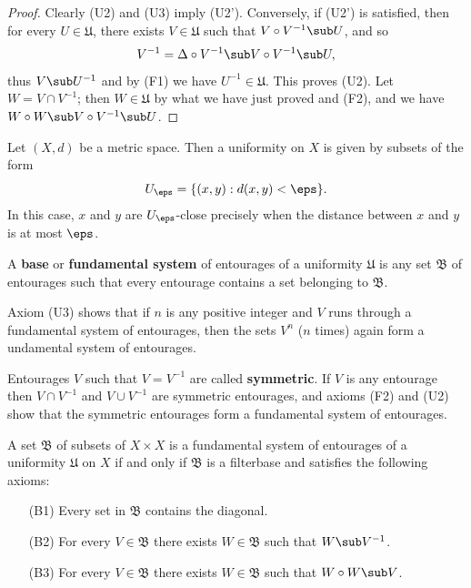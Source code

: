 \begin{proof}
Clearly (U2) and (U3) imply (U2'). Conversely, if (U2') is satisfied, then for every $U\in\mathfrak{U}$, there exists $V\in\mathfrak{U}$ such that $V\circ V^{-1}\sub U$, and so
\[V^{-1}=\Delta\circ V^{-1}\sub V\circ V^{-1}\sub U,\]
thus $V\sub U^{-1}$ and by (F1) we have $U^{-1}\in\mathfrak{U}$. This proves (U2). Let $W=V\cap V^{-1}$; then $W\in\mathfrak{U}$ by what we have just proved and (F2), and we have $W\circ W\sub V\circ V^{-1}\sub U$.
\end{proof}
\begin{example}
Let $(X,d)$ be a metric space. Then a uniformity on $X$ is given by subsets of the form
\[U_\eps=\{(x,y):d(x,y)<\eps\}.\]
In this case, $x$ and $y$ are $U_\eps$-close precisely when the distance between $x$ and $y$ is at most $\eps$.
\end{example}
A \textbf{base} or \textbf{fundamental system} of entourages of a uniformity $\mathfrak{U}$ is any set $\mathfrak{B}$ of entourages such that every entourage contains a set belonging to $\mathfrak{B}$.
\begin{example}
Axiom (U3) shows that if $n$ is any positive integer and $V$ runs through  a fundamental system of entourages, then the sets $V^n$ ($n$ times) again form a undamental system of entourages.
\end{example}
Entourages $V$ such that $V=V^{-1}$ are called \textbf{symmetric}. If $V$ is any entourage then $V\cap V^{-1}$ and $V\cup V^{-1}$ are symmetric entourages, and axioms (F2) and (U2) show that the symmetric entourages form a fundamental system of entourages.
\begin{proposition}\label{uniformity base iff}
A set $\mathfrak{B}$ of subsets of $X\times X$ is a fundamental system of entourages of a uniformity $\mathfrak{U}$ on $X$ if and only if $\mathfrak{B}$ is a filterbase and satisfies the following axioms:
\begin{itemize}
\item[(B1)] Every set in $\mathfrak{B}$ contains the diagonal.
\item[(B2)] For every $V\in\mathfrak{B}$ there exists $W\in\mathfrak{B}$ such that $W\sub V^{-1}$. 
\item[(B3)] For every $V\in\mathfrak{B}$ there exists $W\in\mathfrak{B}$ such that $W\circ W\sub V$.
\end{itemize}
\end{proposition}
